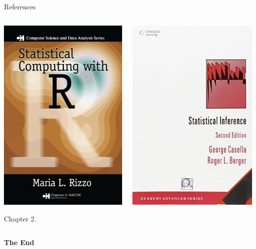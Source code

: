 \documentclass[aspectratio=169,xcolor=dvipsnames,svgnames,x11names,fleqn]{beamer}
\begin{document}
    \begin{frame}{References}

        \begin{columns}
            \begin{center}
        \includegraphics[height=.6\textheight]{figures/stat_computing.jpg}
        
        \vspace{1.5pt}

        Chapter 2.
    \end{center}
            \begin{center}
        \includegraphics[height=.6\textheight]{figures/Statistical_inference.jpg}
    \end{center}
        \end{columns}
        
    \end{frame}
    
    \begin{frame}
        \Huge{\centerline{\color{MediumBlue}\textbf{The End}}}
    \end{frame}
\end{document}
